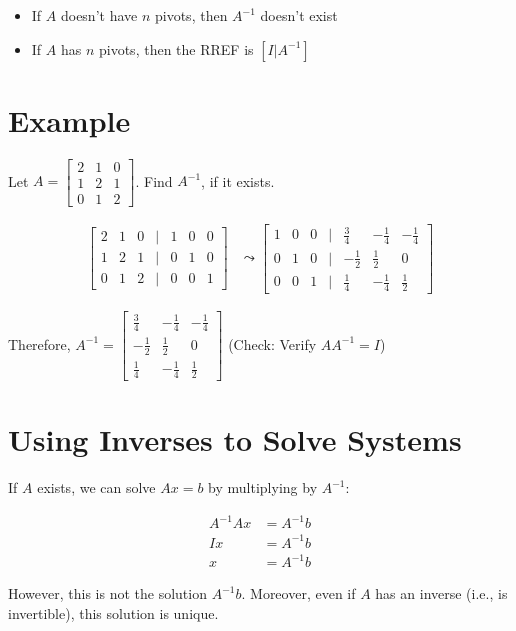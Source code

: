 \documentclass[12pt,a4paper]{article}
\begin{document}
\begin{itemize}
    \item If $A$ doesn't have $n$ pivots, then $A^{-1}$ doesn't exist
    \item If $A$ has $n$ pivots, then the RREF is $[I|A^{-1}]$
\end{itemize}

\section{Example}

Let $A = \begin{bmatrix} 2 & 1 & 0 \\ 1 & 2 & 1 \\ 0 & 1 & 2 \end{bmatrix}$. Find $A^{-1}$, if it exists.

\begin{align*}
    \begin{bmatrix}
    2 & 1 & 0 & | & 1 & 0 & 0 \\
    1 & 2 & 1 & | & 0 & 1 & 0 \\
    0 & 1 & 2 & | & 0 & 0 & 1
    \end{bmatrix}
    &\leadsto
    \begin{bmatrix}
    1 & 0 & 0 & | & \frac{3}{4} & -\frac{1}{4} & -\frac{1}{4} \\
    0 & 1 & 0 & | & -\frac{1}{2} & \frac{1}{2} & 0 \\
    0 & 0 & 1 & | & \frac{1}{4} & -\frac{1}{4} & \frac{1}{2}
    \end{bmatrix}
\end{align*}

Therefore, $A^{-1} = \begin{bmatrix} \frac{3}{4} & -\frac{1}{4} & -\frac{1}{4} \\ -\frac{1}{2} & \frac{1}{2} & 0 \\ \frac{1}{4} & -\frac{1}{4} & \frac{1}{2} \end{bmatrix}$ (Check: Verify $AA^{-1} = I$)

\section{Using Inverses to Solve Systems}

If $A$ exists, we can solve $Ax = b$ by multiplying by $A^{-1}$:

\begin{align*}
    A^{-1}Ax &= A^{-1}b \\
    Ix &= A^{-1}b \\
    x &= A^{-1}b
\end{align*}

However, this is not the solution $A^{-1}b$. Moreover, even if $A$ has an inverse (i.e., is invertible), this solution is unique.
\end{document}
